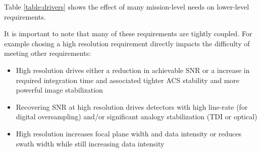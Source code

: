\documentclass[10pt,journal]{IEEEtran}  %
\begin{document}
Table \ref{table:drivers} shows the effect of many mission-level needs on lower-level requirements.
\begin{table}[h!t]
\centering
\caption{System Performance Drivers}
\label{table:drivers}
\end{table}

It is important to note that many of these requirements are tightly coupled.  For example chosing a high resolution requirement directly impacts the difficulty of meeting other requirements:

\begin{itemize}
\item High resolution drives either a reduction in achievable SNR or a increase in required integration time and associated tighter ACS stability and more powerful image stabilization
\item Recovering SNR at high resolution drives detectors with high line-rate (for digital oversampling) and/or significant analogy stabilization (TDI or optical)
\item High resolution increases focal plane width and data intensity or reduces swath width while still increasing data intensity

\end{itemize}
\end{document}
